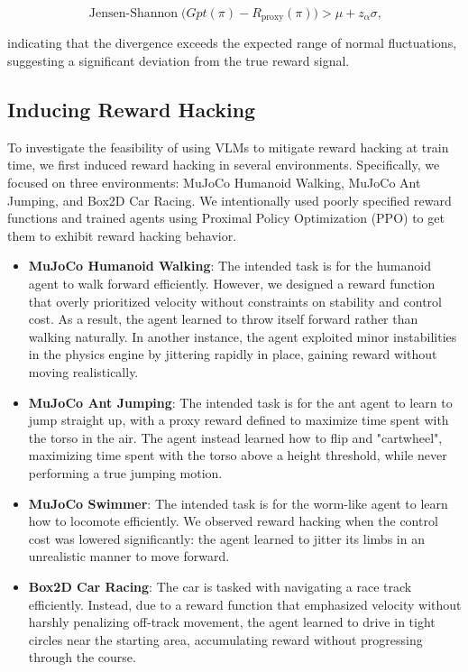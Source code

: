 \documentclass{article}
\begin{document}
\begin{equation}
    \operatorname{Jensen-Shannon}\big(Gpt(\pi) - R_{\text{proxy}}(\pi)\big) > \mu + z_{\alpha} \sigma,
\end{equation}

indicating that the divergence exceeds the expected range of normal fluctuations, suggesting a significant deviation from the true reward signal.

\subsection{Inducing Reward Hacking}
To investigate the feasibility of using VLMs to mitigate reward hacking at train time, we first induced reward hacking in several environments. Specifically, we focused on three environments: MuJoCo Humanoid Walking, MuJoCo Ant Jumping, and Box2D Car Racing. We intentionally used poorly specified reward functions and trained agents using Proximal Policy Optimization (PPO) to get them to exhibit reward hacking behavior.

\begin{itemize}
\item \textbf{MuJoCo Humanoid Walking}: The intended task is for the humanoid agent to walk forward efficiently. However, we designed a reward function that overly prioritized velocity without constraints on stability and control cost. As a result, the agent learned to throw itself forward rather than walking naturally. In another instance, the agent exploited minor instabilities in the physics engine by jittering rapidly in place, gaining reward without moving realistically.

\item \textbf{MuJoCo Ant Jumping}: The intended task is for the ant agent to learn to jump straight up, with a proxy reward defined to maximize time spent with the torso in the air. The agent instead learned how to flip and "cartwheel", maximizing time spent with the torso above a height threshold, while never performing a true jumping motion.

\item \textbf{MuJoCo Swimmer}: The intended task is for the worm-like agent to learn how to locomote efficiently. We observed reward hacking when the control cost was lowered significantly: the agent learned to jitter its limbs in an unrealistic manner to move forward.

\item \textbf{Box2D Car Racing}: The car is tasked with navigating a race track efficiently. Instead, due to a reward function that emphasized velocity without harshly penalizing off-track movement, the agent learned to drive in tight circles near the starting area, accumulating reward without progressing through the course.
\end{itemize}
\end{document}
